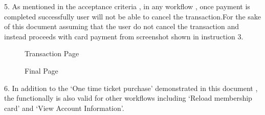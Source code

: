 \documentclass[12pt]{report}
\begin{document}
5.	As mentioned in the acceptance criteria , in any workflow ,  once payment is completed successfully user will not be able to cancel the transaction.For the sake of this document assuming that the user do not cancel the transaction and instead proceeds with card payment from screenshot shown in instruction 3. \\
\begin{figure}[H]
	\caption{\label{fig:transactionpage}Transaction Page}	
\end{figure}

\begin{figure}[H]
	\caption{\label{fig:finalpage}Final Page}	
\end{figure}


6.	In addition to the ‘One time ticket purchase’ demonstrated in this document , the functionally is also valid for other workflows including ‘Reload membership card’ and ‘View Account Information’. \\
\end{document}
